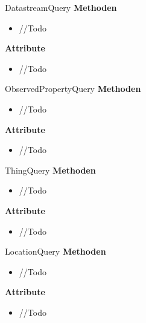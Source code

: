 \begin{Class}{DatastreamQuery}
    \textbf{Methoden}
    \begin{itemize}
        \item //Todo
    \end{itemize}
    
    \textbf{Attribute}
    \begin{itemize}
        \item //Todo
    \end{itemize}
\end{Class}

\begin{Class}{ObservedPropertyQuery}
    \textbf{Methoden}
    \begin{itemize}
        \item //Todo
    \end{itemize}
    
    \textbf{Attribute}
    \begin{itemize}
        \item //Todo
    \end{itemize}
\end{Class}

\begin{Class}{ThingQuery}
    \textbf{Methoden}
    \begin{itemize}
        \item //Todo
    \end{itemize}
    
    \textbf{Attribute}
    \begin{itemize}
        \item //Todo
    \end{itemize}
\end{Class}

\begin{Class}{LocationQuery}
    \textbf{Methoden}
    \begin{itemize}
        \item //Todo
    \end{itemize}
    
    \textbf{Attribute}
    \begin{itemize}
        \item //Todo
    \end{itemize}
\end{Class}


